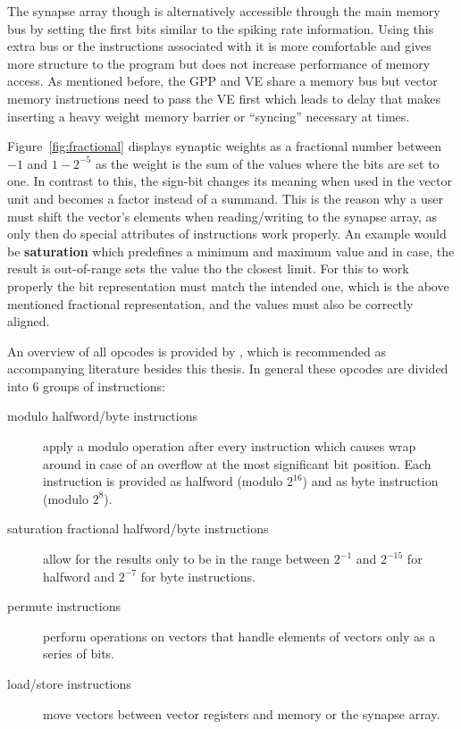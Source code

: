 The synapse array though is alternatively accessible through the main memory bus by setting the first bits similar to the spiking rate information.
Using this extra bus or the instructions associated with it is more comfortable and gives more structure to the program but does not increase performance of memory access.
As mentioned before, the GPP and VE share a memory bus but vector memory instructions need to pass the VE first which leads to delay that makes inserting a heavy weight memory barrier or ``syncing'' necessary at times.


Figure~\ref{fig:fractional} displays synaptic weights as a fractional number between $-1$ and $1-2^{-5}$ as the weight is the sum of the values where the bits are set to one.
In contrast to this, the sign-bit changes its meaning when used in the vector unit and becomes a factor instead of a summand.
This is the reason why a user must shift the vector's elements when reading/writing to the synapse array, as only then do special attributes of instructions work properly.
An example would be \textbf{saturation} which predefines a minimum and maximum value and in case, the result is out-of-range sets the value tho the closest limit.
For this to work properly the bit representation must match the intended one, which is the above mentioned fractional representation, and the values must also be correctly aligned.

An overview of all opcodes is provided by \cite{nuxmanual}, which is recommended as accompanying literature besides this thesis.
In general these opcodes are divided into 6 groups of instructions:
\begin{description}
    \item[modulo halfword/byte instructions] apply a modulo operation after every instruction which causes wrap around in case of an overflow at the most significant bit position.
        Each instruction is provided as halfword (modulo $2^{16}$) and as byte instruction (modulo $2^{8}$).
    \item[saturation fractional halfword/byte instructions] allow for the results only to be in the range between $2^{-1}$ and $2^{-15}$ for halfword and $2^{-7}$ for byte instructions.
    \item[permute instructions] perform operations on vectors that handle elements of vectors only as a series of bits.
    \item[load/store instructions] move vectors between vector registers and memory or the synapse array.
\end{description}

